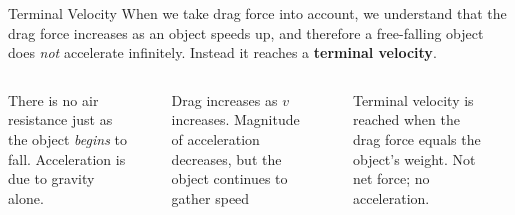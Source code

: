 \documentclass[12pt,compress,aspectratio=169]{beamer}
\begin{document}
\begin{frame}{Terminal Velocity}
  When we take drag force into account, we understand that the drag force
  increases as an object speeds up, and therefore a free-falling object does
  \emph{not} accelerate infinitely. Instead it reaches a
  \textbf{terminal velocity}.

  \begin{columns}
    
    {\footnotesize There is no air resistance just as the object \emph{begins}
      to fall. Acceleration is due to gravity alone.\par}

    \vspace{-.15in}
    \begin{center}
    \end{center}
    

    {\footnotesize Drag increases as $v$ increases. Magnitude of acceleration
      decreases, but the object continues to gather speed\par}

    \vspace{-.15in}
    \begin{center}
    \end{center}
    
    
    {\footnotesize Terminal velocity is reached when the drag force equals the
      object's weight. Not net force; no acceleration.\par}

    \vspace{-.15in}
    \begin{center}
    \end{center}
        
  \end{columns}
\end{frame}
\end{document}
